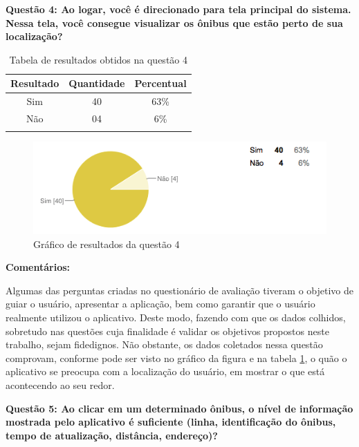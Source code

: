 \textbf{Questão 4: Ao logar, você é direcionado para tela principal do sistema. Nessa tela, você consegue visualizar os ônibus que estão perto de sua localização?}

\begin{center}
\begin{longtable}{c|c|c}
\hline
    \multicolumn{1}{c}{\textbf{Resultado}} & \multicolumn{1}{c}{\textbf{Quantidade}} & \multicolumn{1}{c}{\textbf{Percentual}} \\
\hline
    Sim & 40 &  63\%\\
    \hline
    Não & 04 & 6\%\\
    \hline
\caption{Tabela de resultados obtidos na questão 4}
\label{tabq4}
\end{longtable}
\end{center}


\begin{figure}[h]
\begin{center}
  \includegraphics[width=16cm]{images/graficos/questao4.png}
  \caption{Gráfico de resultados da questão 4}
  \label{fig:questao4}
\end{center}
\end{figure}

\textbf{Comentários:}

Algumas das perguntas criadas no questionário de avaliação tiveram o objetivo de guiar o usuário, apresentar a aplicação, bem como garantir que o usuário realmente utilizou o aplicativo. Deste modo, fazendo com que os dados colhidos, sobretudo nas questões cuja finalidade é validar os objetivos propostos neste trabalho, sejam fidedignos. Não obstante, os dados coletados nessa questão comprovam, conforme pode ser visto no gráfico da figura   e na tabela \ref{tabq4}, o quão o aplicativo se preocupa com a localização do usuário, em mostrar o que está acontecendo ao seu redor.\newline

\textbf{Questão 5: Ao clicar em um determinado ônibus, o nível de informação mostrada pelo aplicativo é suficiente (linha, identificação do ônibus, tempo de atualização, distância, endereço)?}

